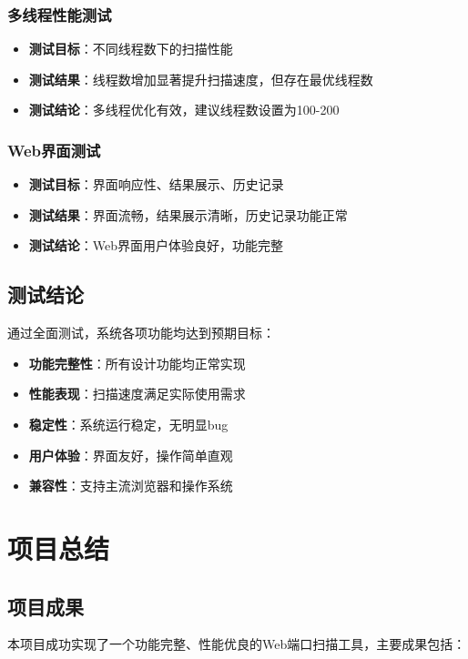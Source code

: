 \documentclass[12pt,hyperref,a4paper,UTF8]{ctexart}
\begin{document}
\subsubsection{多线程性能测试}
\begin{itemize}
    \item \textbf{测试目标}：不同线程数下的扫描性能
    \item \textbf{测试结果}：线程数增加显著提升扫描速度，但存在最优线程数
    \item \textbf{测试结论}：多线程优化有效，建议线程数设置为100-200
\end{itemize}

\subsubsection{Web界面测试}
\begin{itemize}
    \item \textbf{测试目标}：界面响应性、结果展示、历史记录
    \item \textbf{测试结果}：界面流畅，结果展示清晰，历史记录功能正常
    \item \textbf{测试结论}：Web界面用户体验良好，功能完整
\end{itemize}

\subsection{测试结论}
通过全面测试，系统各项功能均达到预期目标：
\begin{itemize}
    \item \textbf{功能完整性}：所有设计功能均正常实现
    \item \textbf{性能表现}：扫描速度满足实际使用需求
    \item \textbf{稳定性}：系统运行稳定，无明显bug
    \item \textbf{用户体验}：界面友好，操作简单直观
    \item \textbf{兼容性}：支持主流浏览器和操作系统
\end{itemize}

\section{项目总结}

\subsection{项目成果}
本项目成功实现了一个功能完整、性能优良的Web端口扫描工具，主要成果包括：
\end{document}
